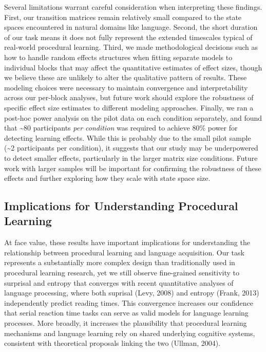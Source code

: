 \documentclass[
  10pt,
  letterpaper]{article}
\begin{document}
Several limitations warrant careful consideration when interpreting
these findings. First, our transition matrices remain relatively small
compared to the state spaces encountered in natural domains like
language. Second, the short duration of our task means it does not fully
represent the extended timescales typical of real-world procedural
learning. Third, we made methodological decisions such as how to handle
random effects structures when fitting separate models to individual
blocks that may affect the quantitative estimates of effect sizes,
though we believe these are unlikely to alter the qualitative pattern of
results. These modeling choices were necessary to maintain convergence
and interpretability across our per-block analyses, but future work
should explore the robustness of specific effect size estimates to
different modeling approaches. Finally, we ran a post-hoc power analysis
on the pilot data on each condition separately, and found that
\textasciitilde80 participants \emph{per condition} was required to
achieve 80\% power for detecting learning effects. While this is
probably due to the small pilot sample (\textasciitilde2 participants
per condition), it suggests that our study may be underpowered to detect
smaller effects, particularly in the larger matrix size conditions.
Future work with larger samples will be important for confirming the
robustness of these effects and further exploring how they scale with
state space size.

\subsection{Implications for Understanding Procedural
Learning}\label{implications-for-understanding-procedural-learning}

At face value, these results have important implications for
understanding the relationship between procedural learning and language
acquisition. Our task represents a substantially more complex design
than traditionally used in procedural learning research, yet we still
observe fine-grained sensitivity to surprisal and entropy that converges
with recent quantitative analyses of language processing, where both
suprisal (Levy, 2008) and entropy (Frank, 2013) independently predict
reading times. This convergence increases our confidence that serial
reaction time tasks can serve as valid models for language learning
processes. More broadly, it increases the plausibility that procedural
learning mechanisms and language learning rely on shared underlying
cognitive systems, consistent with theoretical proposals linking the two
(Ullman, 2004).
\end{document}
